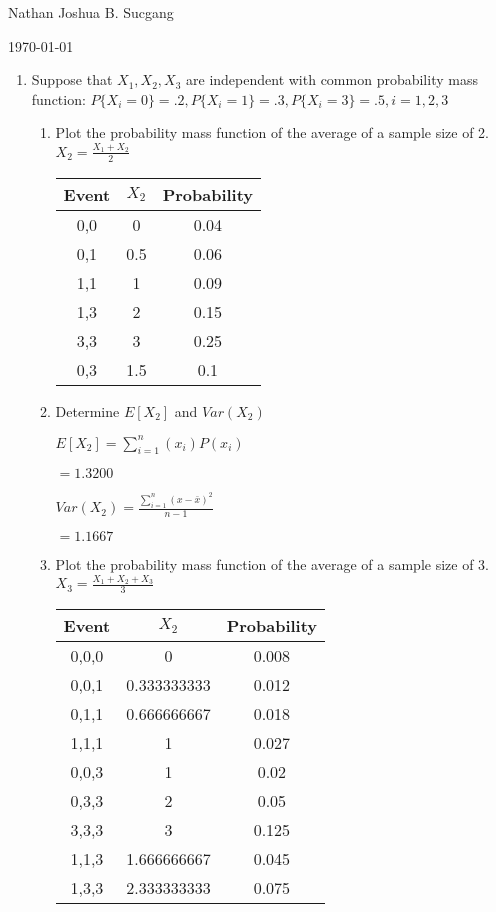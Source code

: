 \documentclass{article}
\begin{document}
Nathan Joshua B. Sucgang

\today

\begin{enumerate}
    \item Suppose that $X_1, X_2, X_3$ are independent with common probability mass function: $P\{X_i = 0 \} = .2, P\{X_i = 1 \} = .3, P\{X_i = 3 \} = .5, i = 1,2,3$
    \begin{enumerate}
        \item Plot the probability mass function of the average of a sample size of 2. $X_2 = \frac{X_1+X_2}{2}$
        \begin{multicols}{2}
            \begin{tabular}{|c|c|c|}
                \hline
                \textbf{Event} & \bf{$X_2$} & \textbf{Probability} \\
                \hline
                0,0 & 0 & 0.04 \\
                0,1 & 0.5 & 0.06 \\
                1,1 & 1 & 0.09 \\
                1,3 & 2 & 0.15 \\
                3,3 & 3 & 0.25 \\
                0,3 & 1.5 & 0.1 \\
                \hline
                \end{tabular}
            \columnbreak
            
            \end{multicols}

            
        \item Determine $E[X_2]$ and $Var(X_2)$
        
        $\displaystyle E[X_2] = \sum_{i=1}^n{(x_i)P(x_i)}$

        $= 1.3200$

        $\displaystyle Var(X_2) = \frac{\sum_{i=1}^n{(x - \bar{x})^2}}{n-1}$

        $= 1.1667$

        \item Plot the probability mass function of the average of a sample size of 3. $X_3 = \frac{X_1+X_2+X_3}{3}$
        
        \begin{tabular}{|c|c|c|}
            \hline
            \textbf{Event} & \bf{$X_2$} & \textbf{Probability} \\
            \hline
            0,0,0 & 0 & 0.008 \\
            0,0,1 & 0.333333333 & 0.012 \\
            0,1,1 & 0.666666667 & 0.018 \\
            1,1,1 & 1 & 0.027 \\
            0,0,3 & 1 & 0.02 \\
            0,3,3 & 2 & 0.05 \\
            3,3,3 & 3 & 0.125 \\
            1,1,3 & 1.666666667 & 0.045 \\
            1,3,3 & 2.333333333 & 0.075 \\
            \hline
            \end{tabular}


\end{enumerate}
\end{enumerate}
\end{document}
